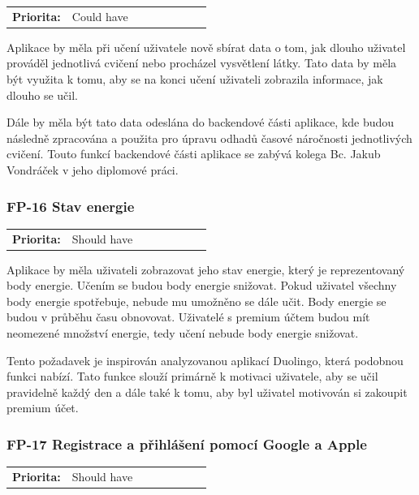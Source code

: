 \begin{tabular}{lp{0.7\linewidth}}
    \textbf{Priorita:} & Could have \\
\end{tabular}

Aplikace by měla při učení uživatele nově sbírat data o tom, jak dlouho uživatel prováděl jednotlivá cvičení nebo procházel vysvětlení látky. Tato data by měla být využita k tomu, aby se na konci učení uživateli zobrazila informace, jak dlouho se učil. 

Dále by měla být tato data odeslána do backendové části aplikace, kde budou následně zpracována a použita pro úpravu odhadů časové náročnosti jednotlivých cvičení. Touto funkcí backendové části aplikace se zabývá kolega Bc. Jakub Vondráček v jeho diplomové práci.

\subsubsection{FP-16 Stav energie}

\begin{tabular}{lp{0.7\linewidth}}
    \textbf{Priorita:} & Should have \\
\end{tabular}

Aplikace by měla uživateli zobrazovat jeho stav energie, který je reprezentovaný body energie.
Učením se budou body energie snižovat. Pokud uživatel všechny body energie spotřebuje, nebude mu umožněno se dále učit. Body energie se budou v průběhu času obnovovat. Uživatelé s premium účtem budou mít neomezené množství energie, tedy učení nebude body energie snižovat.

Tento požadavek je inspirován analyzovanou aplikací Duolingo, která podobnou funkci nabízí. Tato funkce slouží primárně k motivaci uživatele, aby se učil pravidelně každý den a dále také k tomu, aby byl uživatel motivován si zakoupit premium účet.

\subsubsection{FP-17 Registrace a přihlášení pomocí Google a Apple}

\begin{tabular}{lp{0.7\linewidth}}
    \textbf{Priorita:} & Should have \\
\end{tabular}

